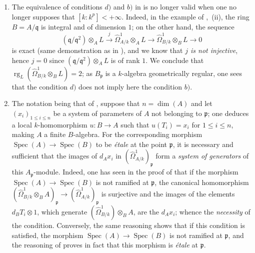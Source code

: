 \begin{remarks}[18.11.11]
\label{IV.18.11.11}
\begin{enumerate}[label=(\roman*)]
  \item The equivalence of conditions $d)$ and $b)$ in  is no longer valid when one no longer supposes that $[k:k^p]<+\infty$.
Indeed, in the example of ,~(ii), the ring $B=A/\mathfrak{q}$ is integral and of dimension $1$; on the other hand, the sequence
\[
  (\mathfrak{q}/\mathfrak{q}^2)\otimes_{A}L\xrightarrow{j}\hat{\Omega}^1_{A/k}\otimes_{A}L\to\hat{\Omega}^1_{B/k}\otimes_{B}L\to 0
\]
is exact (same demonstration as in ), and we know that \emph{$j$ is not injective}, hence $j=0$ since $(\mathfrak{q}/\mathfrak{q}^2)\otimes_AL$ is of rank $1$.
We conclude that $\operatorname{rg}_{L}(\hat{\Omega}^1_{B/k}\otimes_{B}L)=2$; as $B_\mathfrak{p}$ is a $k$-algebra geometrically regular, one sees that the condition $d)$ does not imply here the condition $b)$.
  \item The notation being that of , suppose that $n=\dim(A)$ and let $(x_i)_{1\leq i\leq n}$ be a system of parameters of $A$ not belonging to $\mathfrak{p}$; one deduces a local $k$-homomorphism $u:B\to A$ such that $u(T_i)=x_i$ for $1\leq i\leq n$, making $A$ a finite $B$-algebra.
For the corresponding morphism $\operatorname{Spec}(A)\to\operatorname{Spec}(B)$ to be \emph{\'etale} at the point $\mathfrak{p}$, it is necessary and sufficient that the images of $d_Ax_i$ in $(\hat{\Omega}^1_{A/k})_\mathfrak{p}$ form a \emph{system of generators} of this $A_\mathfrak{p}$-module.
Indeed, one has seen in the proof of  that if the morphism $\operatorname{Spec}(A)\to\operatorname{Spec}(B)$ is not ramified at $\mathfrak{p}$, the canonical homomorphism $(\hat{\Omega}^1_{B/k}\otimes_BA)_\mathfrak{p}\to(\hat{\Omega}^1_{A/k})_\mathfrak{p}$ is surjective and the images of the elements $d_BT_i\otimes 1$, which generate $(\hat{\Omega}^1_{B/k})\otimes_BA$, are the $d_Ax_i$; whence the \emph{necessity} of the condition.
Conversely, the same reasoning shows that if this condition is satisfied, the morphism $\operatorname{Spec}(A)\to\operatorname{Spec}(B)$ is not ramified at $\mathfrak{p}$, and the reasoning of  proves in fact that this morphism is \emph{\'etale} at $\mathfrak{p}$.
\end{enumerate}
\end{remarks}

